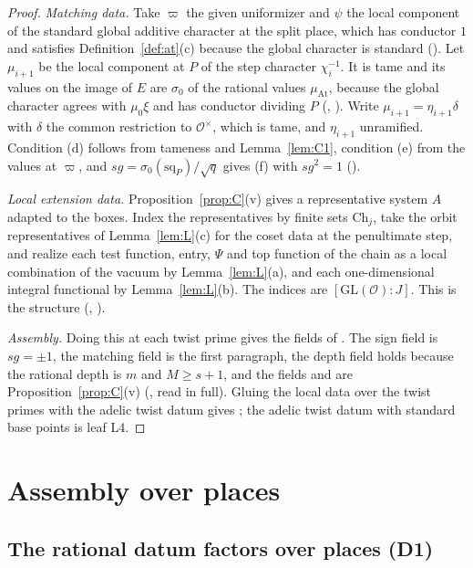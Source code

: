 \documentclass[11pt]{article}
\newcommand{\Ok}{\mathcal O}
\newcommand{\GL}{\mathrm{GL}}
\theoremstyle{definition}
\theoremstyle{remark}
\begin{document}
\begin{proof}
\emph{Matching data.} Take $\varpi$ the given uniformizer and $\psi$ the local component of the standard global additive character at the split place, which has conductor $1$ and satisfies Definition~\ref{def:at}(c) because the global character is standard (). Let $\mu_{i+1}$ be the local component at $P$ of the step character $\chi_i^{-1}$. It is tame and its values on the image of $E$ are $\sigma_0$ of the rational values $\mu_{\mathrm{At}}$, because the global character agrees with $\mu_0\xi$ and has conductor dividing $P$ (, ). Write $\mu_{i+1}=\eta_{i+1}\delta$ with $\delta$ the common restriction to $\Ok^\times$, which is tame, and $\eta_{i+1}$ unramified. Condition (d) follows from tameness and Lemma~\ref{lem:C1}, condition (e) from the values at $\varpi$, and $sg=\sigma_0(\mathrm{sq}_P)/\sqrt q$ gives (f) with $sg^2=1$ ().

\emph{Local extension data.} Proposition~\ref{prop:C}(v) gives a representative system $A$ adapted to the boxes. Index the representatives by finite sets $\mathrm{Ch}_j$, take the orbit representatives of Lemma~\ref{lem:L}(c) for the coset data at the penultimate step, and realize each test function, entry, $\Psi$ and top function of the chain as a local combination of the vacuum by Lemma~\ref{lem:L}(a), and each one-dimensional integral functional by Lemma~\ref{lem:L}(b). The indices are $[\GL(\Ok):J]$. This is the structure  (, ).

\emph{Assembly.} Doing this at each twist prime gives the fields of . The sign field is $sg=\pm1$, the matching field is the first paragraph, the depth field holds because the rational depth is $m$ and $M\ge s+1$, and the fields  and  are Proposition~\ref{prop:C}(v) (, read in full). Gluing the local data over the twist primes with the adelic twist datum gives ; the adelic twist datum with standard base points is leaf L4.
\end{proof}

\section{Assembly over places}\label{sec:A}

\subsection{The rational datum factors over places (D1)}
\end{document}
